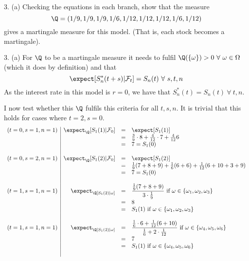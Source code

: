 \documentclass[11pt,a4paper]{article}
\begin{document}
\begin{question}{3. (a)}
  Checking the equations in each branch, show that the measure
  \[ \Q=(1/9,1/9,1/9,1/6,1/12,1/12,1/12,1/6,1/12) \]
  gives a martingale measure for this model. (That is, each stock becomes a martingale).
\end{question}

\begin{answer}{3. (a)}
  For $\Q$ to be a martingale measure it needs to fulfil $\Q(\{\omega\})>0\ \forall\ \omega\in\Omega$ (which it does by definition) and that
  \[ \expect[S^*_n(t+s)|\mathcal{F}_t]=S_n(t)\ \forall\ s,t,n \]
  As the interest rate in this model is $r=0$, we have that $S^*_n(t)=S_n(t)\ \forall\ t,n$.
  \par I now test whether this $\Q$ fulfils this criteria for all $t,s,n$. It is trivial that this holds for cases where $t=2,s=0$.
  \[\begin{array}{r|rcl}
    (t=0,s=1,n=1)&\expect_\Q[S_1(1)|\mathcal{F}_0]&=&\expect[S_1(1)]\\
    &&=&\frac39\cdot8+\frac4{12}\cdot7+\frac4{12}6\\
    &&=&7=S_1(0)\\\\

    (t=0,s=2,n=1)&\expect_\Q[S_1(2)|\mathcal{F}_0]&=&\expect[S_1(2)]\\
    &&=&\frac19(7+8+9)+\frac16(6+6)+\frac1{12}(6+10+3+9)\\
    &&=&7=S_1(0)\\\\

    (t=1,s=1,n=1)&\expect_\Q[S_1(2)|\omega]&=&\dfrac{\frac19(7+8+9)}{3\cdot\frac19}\text{ if }\omega\in\{\omega_1,\omega_2,\omega_3\}\\
    &&=&8\\
    &&=&S_1(1)\text{ if }\omega\in\{\omega_1,\omega_2,\omega_3\}\\\\

    (t=1,s=1,n=1)&\expect_\Q[S_1(2)|\omega]&=&\dfrac{\frac16\cdot 6+\frac1{12}(6+10)}{\frac16+2\cdot\frac1{12}}\text{ if }\omega\in\{\omega_4,\omega_5,\omega_6\}\\
    &&=&7\\
    &&=&S_1(1)\text{ if }\omega\in\{\omega_4,\omega_5,\omega_6\}\\\\


\end{array}\]
\end{answer}
\end{document}
